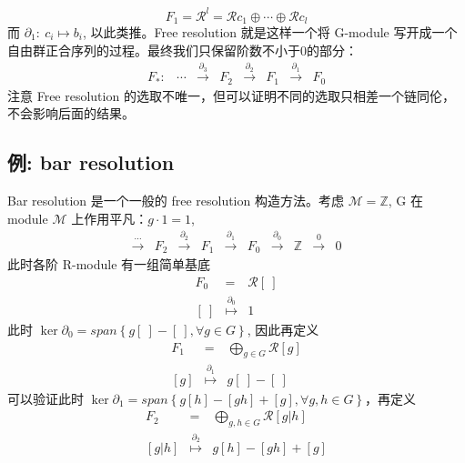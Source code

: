 \documentclass[UTF8]{ctexart}
\begin{document}
\begin{equation}
F_{1}=\mathcal{R}^{l}=\mathcal{R}c_{1}\oplus\cdots\oplus\mathcal{R}c_{l}
\end{equation}
而 $\partial_{1}:\ c_{i}\mapsto b_{i}$, 以此类推。Free resolution 就是这样一个将
G-module 写开成一个自由群正合序列的过程。最终我们只保留阶数不小于0的部分：
\begin{equation}
\begin{array}{cccccccc}
F_{*}: & \cdots & \stackrel{\partial_{3}}{\longrightarrow} & F_{2} & \stackrel{\partial_{2}}{\longrightarrow} & F_{1} & \stackrel{\partial_{1}}{\longrightarrow} & F_{0}\end{array}
\end{equation}
注意 Free resolution 的选取不唯一，但可以证明不同的选取只相差一个链同伦，不会影响后面的结果。
\subsection*{例: bar resolution}
\noindent
Bar resolution 是一个一般的 free resolution 构造方法。考虑 $\mathcal{M}=\mathbb{Z}$,
G 在 module $\mathcal{M}$ 上作用平凡：$g\cdot1=1$, 
\begin{equation}
\begin{array}{cccccccccc}
\stackrel{\cdots}{\longrightarrow} & F_{2} & \stackrel{\partial_{2}}{\longrightarrow} & F_{1} & \stackrel{\partial_{1}}{\longrightarrow} & F_{0} & \stackrel{\partial_{0}}{\longrightarrow} & \mathbb{Z} & \stackrel{0}{\longrightarrow} & 0\end{array}
\end{equation}
此时各阶 R-module 有一组简单基底
\begin{eqnarray}
F_{0} & = & \mathcal{R}\left[\ \right]\\
\left[\ \right] & \stackrel{\partial_{0}}{\longmapsto} & 1
\end{eqnarray}
此时 $\ker\partial_{0}=span\left\{ g\left[\ \right]-\left[\ \right],\forall g\in G\right\} $,
因此再定义
\begin{eqnarray}
F_{1} & = & \bigoplus_{g\in G}\mathcal{R}\left[g\right]\\
\left[g\right] & \stackrel{\partial_{1}}{\longmapsto} & g\left[\ \right]-\left[\ \right]
\end{eqnarray}
可以验证此时 $\ker\partial_{1}=span\left\{ g\left[h\right]-\left[gh\right]+\left[g\right],\forall g,h\in G\right\} $，再定义
\begin{eqnarray}
F_{2} & = & \bigoplus_{g,h\in G}\mathcal{R}\left[\left.g\right|h\right]\\
\left[\left.g\right|h\right] & \stackrel{\partial_{2}}{\longmapsto} & g\left[h\right]-\left[gh\right]+\left[g\right]
\end{eqnarray}
\end{document}
